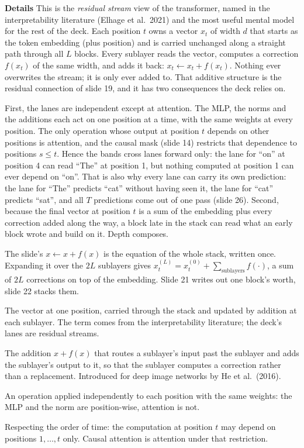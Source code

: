 \documentclass[11pt,letterpaper]{article}
\newcommand{\para}[1]{\medskip\noindent\textbf{#1}\quad}
\newenvironment{terms}{\begin{tcolorbox}[termsbox]\begin{description}[leftmargin=1.1em,itemsep=3pt,topsep=2pt,font=\normalfont]}{\end{description}\end{tcolorbox}}
\newcommand{\term}[2]{\item[\textbf{#1}]\index{#1} #2}
\begin{document}
\para{Details} This is the \emph{residual stream} view of the transformer, named in the interpretability literature (Elhage et al.\ 2021) and the most useful mental model for the rest of the deck. Each position $t$ owns a vector $x_t$ of width $d$ that starts as the token embedding (plus position) and is carried unchanged along a straight path through all $L$ blocks. Every sublayer reads the vector, computes a correction $f(x_t)$ of the same width, and adds it back: $x_t\leftarrow x_t+f(x_t)$. Nothing ever overwrites the stream; it is only ever added to. That additive structure is the residual connection of slide 19, and it has two consequences the deck relies on.

First, the lanes are independent except at attention. The MLP, the norms and the additions each act on one position at a time, with the same weights at every position. The only operation whose output at position $t$ depends on other positions is attention, and the causal mask (slide 14) restricts that dependence to positions $s\le t$. Hence the bands cross lanes forward only: the lane for ``on'' at position 4 can read ``The'' at position 1, but nothing computed at position 1 can ever depend on ``on''. That is also why every lane can carry its own prediction: the lane for ``The'' predicts ``cat'' without having seen it, the lane for ``cat'' predicts ``sat'', and all $T$ predictions come out of one pass (slide 26). Second, because the final vector at position $t$ is a sum of the embedding plus every correction added along the way, a block late in the stack can read what an early block wrote and build on it. Depth composes.

The slide's $x\leftarrow x+f(x)$ is the equation of the whole stack, written once. Expanding it over the $2L$ sublayers gives $x_t^{(L)}=x_t^{(0)}+\sum_{\text{sublayers}}f(\cdot)$, a sum of $2L$ corrections on top of the embedding. Slide 21 writes out one block's worth, slide 22 stacks them.

\begin{terms}
\term{residual stream}{The vector at one position, carried through the stack and updated by addition at each sublayer. The term comes from the interpretability literature; the deck's lanes are residual streams.}
\term{residual connection}{The addition $x+f(x)$ that routes a sublayer's input past the sublayer and adds the sublayer's output to it, so that the sublayer computes a correction rather than a replacement. Introduced for deep image networks by He et al.\ (2016).}
\term{position-wise}{An operation applied independently to each position with the same weights: the MLP and the norm are position-wise, attention is not.}
\term{causal}{Respecting the order of time: the computation at position $t$ may depend on positions $1,\dots,t$ only. Causal attention is attention under that restriction.}
\end{terms}
\end{document}
